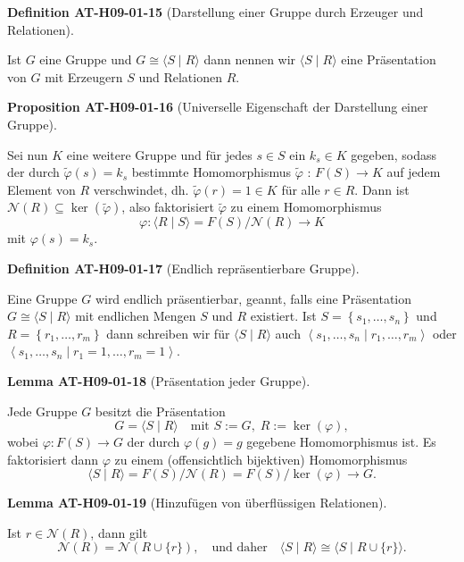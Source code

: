 \documentclass[10pt, letterpaper]{article}
\newcommand{\CustomHeading}[3]{%
  \par\medskip\noindent%
  \textbf{#1 #2} \textnormal{(#3)}.\enskip%
}
\newenvironment{DEF}[2]{\begin{unitbox}\CustomHeading{Definition}{#1}{#2}}{\end{unitbox}}
\newenvironment{PROP}[2]{\begin{unitbox}\CustomHeading{Proposition}{#1}{#2}}{\end{unitbox}}
\newenvironment{LEM}[2]{\begin{unitbox}\CustomHeading{Lemma}{#1}{#2}}{\end{unitbox}}
\begin{document}
\begin{DEF}{AT-H09-01-15}{Darstellung einer Gruppe durch Erzeuger und Relationen}
Ist $G$ eine Gruppe und $G \cong\langle S \mid R\rangle$ dann nennen wir $\langle S \mid R\rangle$ eine Präsentation von $G$ mit Erzeugern $S$ und Relationen $R$.
\end{DEF}

\begin{PROP}{AT-H09-01-16}{Universelle Eigenschaft der Darstellung einer Gruppe}
Sei nun $K$ eine weitere Gruppe und für jedes $s \in S$ ein $k_s \in K$ gegeben, sodass der durch $\tilde{\varphi}(s)=k_s$ bestimmte Homomorphismus $\tilde{\varphi}$ : $F(S) \rightarrow K$ auf jedem Element von $R$ verschwindet, dh. $\tilde{\varphi}(r)=1 \in K$ für alle $r \in R$. Dann ist $\mathcal{N}(R) \subseteq \operatorname{ker}(\tilde{\varphi})$, also faktorisiert $\tilde{\varphi}$ zu einem Homomorphismus 
$$\varphi:\langle R \mid S\rangle=F(S) / \mathcal{N}(R) \rightarrow K$$ 
mit $\varphi(s)=k_s$.
\end{PROP}

\begin{DEF}{AT-H09-01-17}{Endlich repräsentierbare Gruppe}
Eine Gruppe $G$ wird endlich präsentierbar, geannt, falls eine Präsentation $G \cong\langle S \mid R\rangle$ mit endlichen Mengen $S$ und $R$ existiert. Ist $S=\left\{s_1, \ldots, s_n\right\}$ und $R=\left\{r_1, \ldots, r_m\right\}$ dann schreiben wir für $\langle S \mid R\rangle$ auch $\left\langle s_1, \ldots, s_n \mid r_1, \ldots, r_m\right\rangle$ oder $\left\langle s_1, \ldots, s_n \mid r_1=1, \ldots, r_m=1\right\rangle$.
\end{DEF}




\begin{LEM}{AT-H09-01-18}{Präsentation jeder Gruppe}
Jede Gruppe $G$ besitzt die Präsentation
\[
G=\langle S \mid R\rangle \quad\text{mit } S := G,\; R := \ker(\varphi),
\]
wobei $\varphi: F(S) \rightarrow G$ der durch $\varphi(g)=g$ gegebene Homomorphismus ist.
Es faktorisiert dann $\varphi$ zu einem (offensichtlich bijektiven) Homomorphismus
\[
\langle S \mid R\rangle = F(S)/\mathcal{N}(R) = F(S)/\ker(\varphi) \longrightarrow G.
\]
\end{LEM}



\begin{LEM}{AT-H09-01-19}{Hinzufügen von überflüssigen Relationen}
Ist $r \in \mathcal{N}(R)$, dann gilt
\[
\mathcal{N}(R) = \mathcal{N}(R \cup \{r\}),
\quad\text{und daher}\quad
\langle S \mid R \rangle \cong \langle S \mid R \cup \{r\} \rangle.
\]
\end{LEM}
\end{document}
